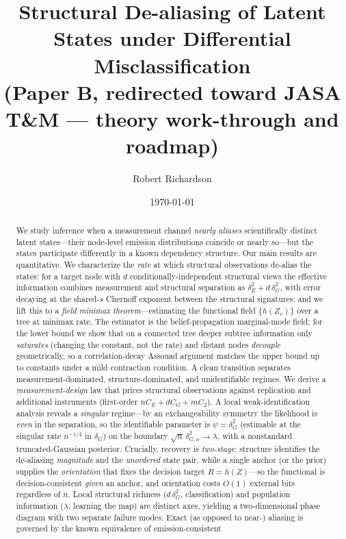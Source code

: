 \documentclass[11pt]{article}
\title{\textbf{Structural De-aliasing of Latent States under Differential Misclassification}\\[3pt]
\large\normalfont(Paper B, redirected toward JASA T\&M --- theory work-through and roadmap)}
\author{Robert Richardson}
\date{\today}
\begin{document}
\maketitle

\begin{abstract}
We study inference when a measurement channel \emph{nearly aliases} scientifically distinct latent states---their
node-level emission distributions coincide or nearly so---but the states participate differently in a known
dependency structure. Our main results are quantitative. We characterize the \emph{rate} at which structural
observations de-alias the states: for a target node with $d$ conditionally-independent structural views the
effective information combines measurement and structural separation as $\delta_E^2+d\,\delta_G^2$, with error
decaying at the shared-$s$ Chernoff exponent between the structural signatures; and we lift this to a \emph{field
minimax theorem}---estimating the functional field $\{h(Z_v)\}$ over a tree at minimax rate. The estimator is the
belief-propagation marginal-mode field; for the lower bound we show that on a connected tree deeper subtree
information only \emph{saturates} (changing the constant, not the rate) and distant nodes \emph{decouple}
geometrically, so a correlation-decay Assouad argument matches the upper bound up to constants under a mild
contraction condition. A clean transition separates measurement-dominated, structure-dominated, and
unidentifiable regimes. We derive a \emph{measurement-design} law that prices structural
observations against replication and additional instruments (first-order $nC_E+dC_G+mC_2$). A local
weak-identification analysis reveals a \emph{singular} regime---by an exchangeability symmetry the likelihood is
\emph{even} in the separation, so the identifiable parameter is $\psi=\delta_G^2$ (estimable at the singular rate
$n^{-1/4}$ in $\delta_G$) on the boundary $\sqrt n\,\delta_{G,n}^2\to\lambda$, with a nonstandard truncated-Gaussian
posterior. Crucially, recovery is \emph{two-stage}: structure identifies the de-aliasing \emph{magnitude} and the
\emph{unordered} state pair, while a single anchor (or the prior) supplies the \emph{orientation} that fixes the
decision target $R=h(Z)$---so the functional is decision-consistent \emph{given} an anchor, and orientation costs
$O(1)$ external bits regardless of $n$. Local structural richness ($d\,\delta_G^2$, classification) and population
information ($\lambda$, learning the map) are distinct axes, yielding a two-dimensional phase diagram with two
separate failure modes. Exact (as opposed to near-) aliasing is governed by the known equivalence of emission-consistent

\end{abstract}
\end{document}
